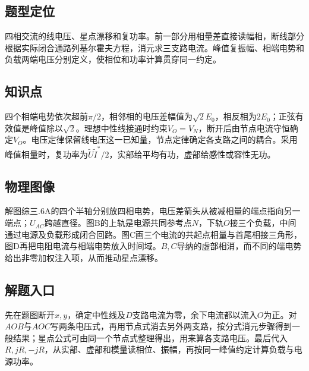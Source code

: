 \documentclass[UTF8,fontset=fandol,a4paper,11pt]{ctexart}
\begin{document}


\subsection*{题型定位}

四相交流的线电压、星点漂移和复功率。前一部分用相量差直接读幅相，断线部分根据实际闭合通路列基尔霍夫方程，消元求三支路电流。峰值复振幅、相端电势和负载两端电压分别定义，使相位和功率计算贯穿同一约定。



\subsection*{知识点}

四个相端电势依次超前$\pi/2$，相邻相的电压差幅值为$\sqrt2E_0$，相反相为$2E_0$；正弦有效值是峰值除以$\sqrt2$。理想中性线接通时约束$V_O=V_N$，断开后由节点电流守恒确定$V_O$。电压定律保留线电压这一已知量，节点定律确定各支路之间的耦合。采用峰值相量时，复功率为$\widetilde U\widetilde I^*/2$，实部给平均有功，虚部给感性或容性无功。



\subsection*{物理图像}

解图综三.6A的四个半轴分别放四相电势，电压差箭头从被减相量的端点指向另一端点；$U_{AC}$跨越直径。图B的上轨是电源共同参考点$N$，下轨$O$接三个负载，中间通过电源及负载形成闭合回路。图C画三个电流的共起点相量与首尾相接三角形，图D再把电阻电流与相端电势放入时间域。$B,C$导纳的虚部相消，而不同的端电势给出非零加权注入项，从而推动星点漂移。



\subsection*{解题入口}

先在题图断开$x,y$，确定中性线及$D$支路电流为零，余下电流都以流入$O$为正。对$AOB$与$AOC$写两条电压式，再用节点式消去另外两支路，按分式消元步骤得到一般结果；星点公式可由同一个节点式整理得出，用来算各支路电压。最后代入$R,jR,-jR$，从实部、虚部和模量读相位、振幅，再按同一峰值约定计算负载与电源功率。
\end{document}
